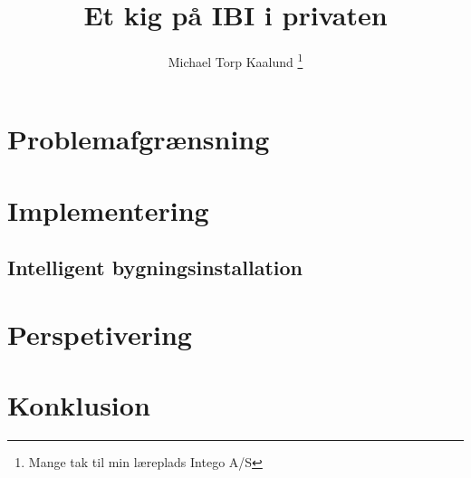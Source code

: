\documentclass[12pt,a4paper,twoside]{article}
\title{Et kig på IBI i privaten}
\author{Michael Torp Kaalund \thanks{Mange tak til min læreplads Intego A/S}}
\begin{document}
    



    \tableofcontents

    \newpage

    

    \section{Problemafgrænsning}

    \section{Implementering}
        
        \subsection{Intelligent bygningsinstallation}

    \section{Perspetivering}

    \section{Konklusion}

    \appendix

    
    
    

    
\end{document}
